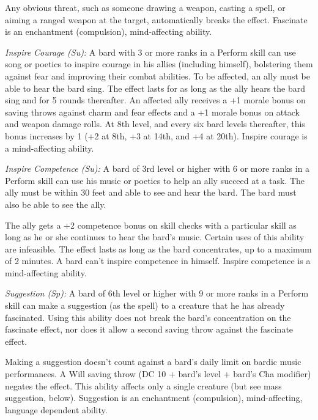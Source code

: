 Any obvious threat, such as someone drawing a weapon, casting a spell, or aiming a ranged weapon at the target, automatically breaks the effect. Fascinate is an enchantment (compulsion), mind-affecting ability.

\textit{Inspire Courage (Su):} A bard with 3 or more ranks in a Perform skill can use song or poetics to inspire courage in his allies (including himself), bolstering them against fear and improving their combat abilities. To be affected, an ally must be able to hear the bard sing. The effect lasts for as long as the ally hears the bard sing and for 5 rounds thereafter. An affected ally receives a +1 morale bonus on saving throws against charm and fear effects and a +1 morale bonus on attack and weapon damage rolls. At 8th level, and every six bard levels thereafter, this bonus increases by 1 (+2 at 8th, +3 at 14th, and +4 at 20th). Inspire courage is a mind-affecting ability.

\textit{Inspire Competence (Su):} A bard of 3rd level or higher with 6 or more ranks in a Perform skill can use his music or poetics to help an ally succeed at a task. The ally must be within 30 feet and able to see and hear the bard. The bard must also be able to see the ally.

The ally gets a +2 competence bonus on skill checks with a particular skill as long as he or she continues to hear the bard's music. Certain uses of this ability are infeasible. The effect lasts as long as the bard concentrates, up to a maximum of 2 minutes. A bard can't inspire competence in himself. Inspire competence is a mind-affecting ability.

\textit{Suggestion (Sp):} A bard of 6th level or higher with 9 or more ranks in a Perform skill can make a suggestion (as the spell) to a creature that he has already fascinated. Using this ability does not break the bard's concentration on the fascinate effect, nor does it allow a second saving throw against the fascinate effect.

Making a suggestion doesn't count against a bard's daily limit on bardic music performances. A Will saving throw (DC 10 +  bard's level + bard's Cha modifier) negates the effect. This ability affects only a single creature (but see mass suggestion, below). Suggestion is an enchantment (compulsion), mind-affecting, language dependent ability.

